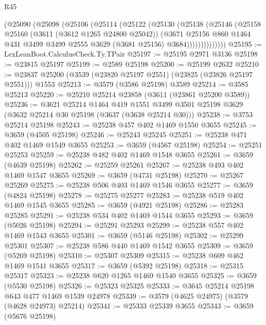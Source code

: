 \begin{lexlean}{R45}
\begin{coremodule}
            (@25090
              (@25098
                (@25106
                  (@25114
                    (@25122
                      (@25130
                        (@25138
                          (@25146
                            (@25158
                              @25160
                              (@3611 (@3612 @1265 @24800 @25042))
                              (@3671
                                @25156
                                @860
                                @1464
                                @431
                                @3499
                                @3499
                                @2555
                                @3629
                                (@3681 @25156)
                                @3684))))))))))))))
@25195 := LexLeanBoot.CalculusCheck.Ty.TPair
@25197 := @25195 @2971 @3136
@25198 := @23815 @25197
@25199 := @2589 @25198
@25200 := @25199 @2632
@25210 := @23837 @25200 (@3539 (@23820 @25197 @2551) (@23825 (@23826 @25197 @2551))) @1553
@25213 := @3579 (@3586 @25198) @3589
@25214 := @3585 @25213
@25220 := @25210 @25214 @23858 (@3611 (@23861 @25200 @3589))
@25236 := @3621
    @25214
    @1464
    @419
    @1551
    @3499
    @3501
    @25198
    @3629
    (@3632 @25214 @30 @25198 (@3637 (@3638 @25214 @30)))
@25238 := @3753 @25214 @25198
@25243 := @25238 @457 @402 @1469 @1550 @3655
@25245 := @3659 (@4505 @25198)
@25246 := @25243 @25245
@25251 := @25238 @471 @402 @1469 @1549 @3655
@25253 := @3659 (@4567 @25198)
@25254 := @25251 @25253
@25259 := @25238 @482 @402 @1469 @1548 @3655
@25261 := @3659 (@4639 @25198)
@25262 := @25259 @25261
@25267 := @25238 @493 @402 @1469 @1547 @3655
@25269 := @3659 (@4731 @25198)
@25270 := @25267 @25269
@25275 := @25238 @506 @403 @1469 @1546 @3655
@25277 := @3659 (@4824 @25198)
@25278 := @25275 @25277
@25283 := @25238 @519 @402 @1469 @1545 @3655
@25285 := @3659 (@4921 @25198)
@25286 := @25283 @25285
@25291 := @25238 @534 @402 @1469 @1544 @3655
@25293 := @3659 (@5026 @25198)
@25294 := @25291 @25293
@25299 := @25238 @557 @402 @1469 @1543 @3655
@25301 := @3659 (@5146 @25198)
@25302 := @25299 @25301
@25307 := @25238 @586 @440 @1469 @1542 @3655
@25309 := @3659 (@5269 @25198)
@25310 := @25307 @25309
@25315 := @25238 @609 @462 @1469 @1541 @3655
@25317 := @3659 (@5392 @25198)
@25318 := @25315 @25317
@25323 := @25238 @620 @1265 @1469 @1540 @3655
@25325 := @3659 (@5530 @25198)
@25326 := @25323 @25325
@25333 := @3645 @25214 @25198 @643 @477 @1469 @1539 @24978
@25339 := @3579 (@4625 @24975) (@3579 (@4628 @24973) @25214)
@25341 := @25333 @25339 @3655
@25343 := @3659 (@5676 @25198)

\end{coremodule}
\end{lexlean}
